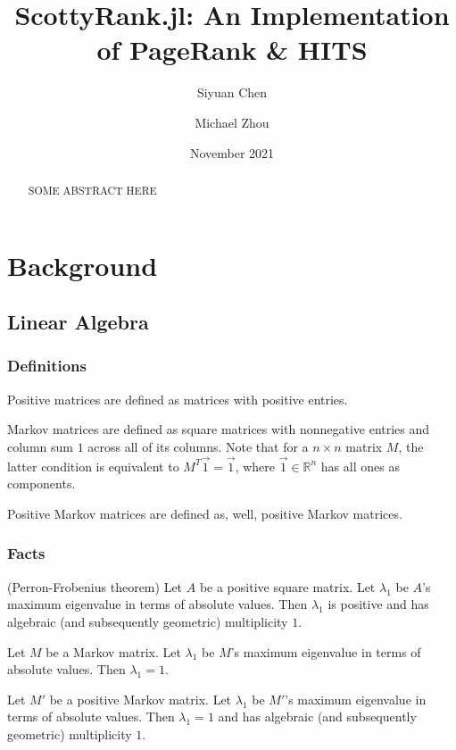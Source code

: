\documentclass[12pt, titlepage, twoside]{amsart}
\newcommand{\R}{\ensuremath{\mathbb R}}
\begin{document}
\title[ScottyRank.jl]{ScottyRank.jl: An Implementation of PageRank \& HITS}

\author{Siyuan Chen}
\author{Michael Zhou}
\date{November 2021}

\begin{abstract}
  SOME ABSTRACT HERE
\end{abstract}

\maketitle

\tableofcontents

\section{Background}

\subsection{Linear Algebra}

\subsubsection{Definitions}

Positive matrices are defined as matrices with positive entries.

Markov matrices are defined as square matrices with nonnegative entries and column sum $1$ across all of its columns.
Note that for a $n\times n$ matrix $M$, the latter condition is equivalent to $M^T\vec{1} = \vec{1}$,
where $\vec{1}\in\R^n$ has all ones as components.

Positive Markov matrices are defined as, well, positive Markov matrices.

\subsubsection{Facts}

(Perron-Frobenius theorem)
Let $A$ be a positive square matrix.
Let $\lambda_1$ be $A$'s maximum eigenvalue in terms of absolute values.
Then $\lambda_1$ is positive and has algebraic (and subsequently geometric) multiplicity $1$.

Let $M$ be a Markov matrix.
Let $\lambda_1$ be $M$'s maximum eigenvalue in terms of absolute values.
Then $\lambda_1 = 1$.

Let $M'$ be a positive Markov matrix.
Let $\lambda_1$ be $M'$'s maximum eigenvalue in terms of absolute values.
Then $\lambda_1 = 1$ and has algebraic (and subsequently geometric) multiplicity $1$.
\end{document}
